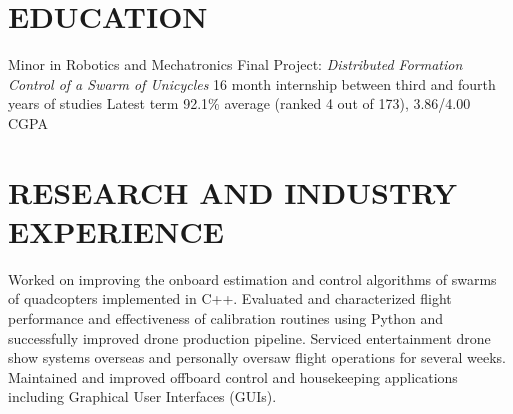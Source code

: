 \documentclass{ResumeTemplate}
\begin{document}
    \raggedright\begin{minipage}[c]{0.66\linewidth}

        \centering{}
        \vspace{0.5cm}

        \section{EDUCATION}




        \workitemsfour
        {Minor in Robotics and Mechatronics}
        {Final Project: \textit{Distributed Formation Control of a Swarm of Unicycles}}
        {16 month internship between third and fourth years of studies}
        {Latest term 92.1\% average (ranked 4 out of 173), 3.86/4.00 CGPA}
        \vspace*{\baselineskip}

        \section{RESEARCH AND INDUSTRY EXPERIENCE}
        

        \workitemsfour
        {Worked on improving the onboard estimation and control algorithms of swarms of quadcopters implemented in C++.}
        {Evaluated and characterized flight performance and effectiveness of calibration routines using Python and successfully improved drone production pipeline.}
        {Serviced entertainment drone show systems overseas and personally oversaw flight operations for several weeks.}
        {Maintained and improved offboard control and housekeeping applications including Graphical User Interfaces (GUIs).}
        

\end{minipage}
\end{document}
